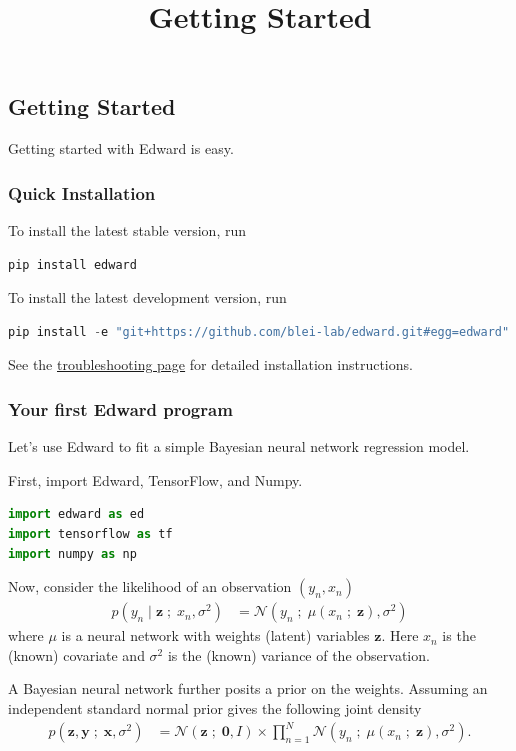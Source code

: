 \title{Getting Started}

\subsection{Getting Started}
Getting started with Edward is easy. 

\subsubsection{Quick Installation}
To install the latest stable version, run

\begin{lstlisting}[language=Java]
pip install edward
\end{lstlisting}

To install the latest development version, run

\begin{lstlisting}[language=Java]
pip install -e "git+https://github.com/blei-lab/edward.git#egg=edward"
\end{lstlisting}

See the \href{troubleshooting.html}{troubleshooting page} for detailed
installation instructions.


\subsubsection{Your first Edward program}

Let's use Edward to fit a simple Bayesian neural network regression model.

First, import Edward, TensorFlow, and Numpy.
\begin{lstlisting}[language=Python]
import edward as ed
import tensorflow as tf
import numpy as np  
\end{lstlisting}

Now, consider the likelihood of an observation $(y_n, x_n)$
\begin{align*}
  p(y_n \mid \mathbf{z} \;;\; x_n, \sigma^2)
  &=
  \mathcal{N}(y_n \;;\; \mu(x_n\;;\;\mathbf{z}), \sigma^2)
\end{align*} 
where $\mu$ is a neural network with weights (latent) variables 
$\mathbf{z}$. Here $x_n$ is the (known) covariate and $\sigma^2$ is the
(known) variance of the observation.

A Bayesian neural network further posits a prior on the weights. Assuming an
independent standard normal prior gives the following joint density
\begin{align*}
  p(\mathbf{z}, \mathbf{y} \;;\; \mathbf{x}, \sigma^2)
  &=
  \mathcal{N}(\mathbf{z} \;;\; \mathbf{0}, I)
  \times
  \prod_{n=1}^N
  \mathcal{N}(y_n \;;\; \mu(x_n\;;\;\mathbf{z}), \sigma^2).
\end{align*}

